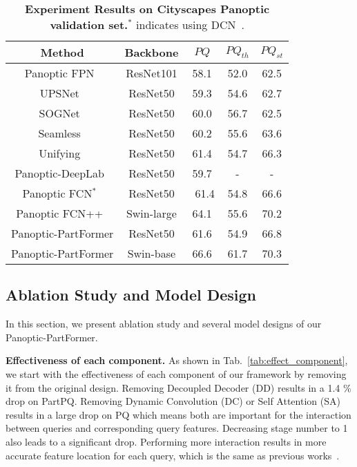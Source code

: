 \begin{table}[t]
\centering
\begin{adjustbox}{width=0.42\textwidth}
\begin{tabular}{c c c c c}
\toprule[0.15em]
\textbf{Method}  &  Backbone  & $PQ$ & $PQ_{th}$ & $PQ_{st}$  \\ 
\midrule[0.15em]
Panoptic FPN~\cite{kirillov2019panopticfpn} & ResNet101 & 58.1 & 52.0 & 62.5 \\
  UPSNet~\cite{xiong2019upsnet} & ResNet50 & 59.3 & 54.6 & 62.7 \\
  SOGNet~\cite{yang2019sognet} & ResNet50 & 60.0 & { 56.7} & 62.5 \\
  Seamless~\cite{porzi2019seamless} & ResNet50 & 60.2 & 55.6 & 63.6 \\
  Unifying~\cite{li2020unifying} & ResNet50 & 61.4 & 54.7 & 66.3 \\
  Panoptic-DeepLab~\cite{cheng2020panoptic} & ResNet50 & 59.7 & - & - \\
  Panoptic FCN$^*$~\cite{li2020panopticFCN} & ResNet50 & {\ 61.4} & 54.8 & { 66.6} \\
  Panoptic FCN++~\cite{li2021fully} & Swin-large & 64.1 & 55.6 & 70.2 \\
  \hline
Panoptic-PartFormer & ResNet50 & 61.6 & 54.9 & 66.8 \\
Panoptic-PartFormer & Swin-base & 66.6 & 61.7 & 70.3 \\
\bottomrule
\end{tabular}
\end{adjustbox}
\caption{ \small \textbf{Experiment Results on Cityscapes Panoptic validation set.}$^*$ indicates using DCN~\cite{deformablev2}.}
\label{tab:experiments_res_cityscapes}
\end{table}





\subsection{Ablation Study and Model Design}
\label{sec:ablation}
In this section, we present ablation study and several model designs of our Panoptic-PartFormer. 

\noindent
\textbf{Effectiveness of each component.} As shown in Tab.~\ref{tab:effect_component}, we start with the effectiveness of each component of our framework by removing it from the original design. Removing Decoupled Decoder (DD) results in a 1.4 \% drop on PartPQ. Removing Dynamic Convolution (DC) or Self Attention (SA) results in a large drop on PQ which means both are important for the interaction between queries and corresponding query features. Decreasing stage number to 1 also leads to a significant drop. Performing more interaction results in more accurate feature location for each query, which is the same as previous works~\cite{zhang2021knet,peize2020sparse}.


